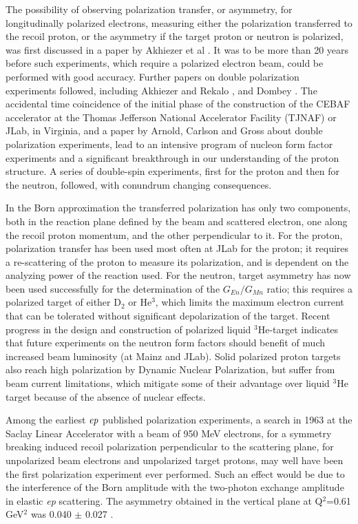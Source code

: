 The possibility of observing polarization transfer, or asymmetry, for longitudinally polarized electrons, measuring either 
the polarization transferred to the recoil proton, or the asymmetry if the target proton or neutron is polarized, was
first discussed in a paper by Akhiezer et al \cite{akh1}. It was to be more than 20 years before such experiments, which 
require a polarized electron beam, could be performed with good accuracy. 
Further papers on double polarization experiments followed, including Akhiezer and Rekalo  \cite{akh2}, and Dombey \cite{dombey}.
The accidental time coincidence of the initial phase of the construction of the CEBAF accelerator at the Thomas Jefferson National
 Accelerator Facility (TJNAF) or JLab, in Virginia,
 and a paper by Arnold, Carlson and Gross \cite{arnold} about double polarization experiments, lead to an intensive program of
 nucleon form factor experiments and a significant breakthrough in our understanding of the proton structure. A series of
 double-spin experiments, first for the proton and then for the neutron, followed, with conundrum changing consequences. 

In the Born  approximation the transferred polarization has only two components, both in the 
reaction plane defined by the beam and scattered electron, one along the recoil proton momentum, and the other perpendicular to it.
For the proton, polarization transfer has been used most often at JLab for the proton; it requires a re-scattering of the proton to
 measure its polarization, 
and is dependent on the analyzing power of the reaction used. For the neutron, target asymmetry has now been used successfully
\cite{riordan:2010} for the determination of the $G_{En}/G_{Mn}$ ratio; this requires a polarized target of either D$_2$ or He$^3$, 
which limits the maximum electron current that can be
 tolerated without significant depolarization of the target. Recent progress in the design and construction of polarized liquid
 $^3$He-target \cite{dolph:2011} indicates that future experiments on the neutron form factors should benefit of much increased beam luminosity
 (at Mainz and JLab). Solid polarized proton targets also reach high polarization by Dynamic Nuclear Polarization, but suffer
 from beam current limitations, which mitigate some of their advantage over liquid $^3$He target  because of the absence of
 nuclear effects.  

Among the earliest ${\it ep}$ published polarization experiments, a search in 1963 at the Saclay Linear Accelerator with a beam 
of 950 MeV electrons, for a symmetry 
breaking induced recoil polarization perpendicular to the scattering plane, for unpolarized beam electrons and unpolarized target protons, 
may well have been the first polarization experiment ever performed. Such an effect would be due to the interference of the Born
 amplitude with the two-photon exchange amplitude in elastic {\it {ep}} scattering. The asymmetry obtained in the vertical plane
at Q$^2$=0.61 GeV$^2$ was 0.040 $\pm$ 0.027 \cite{bizot}.

